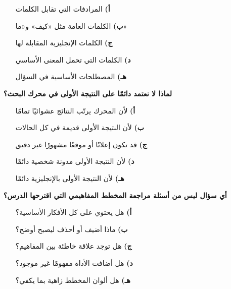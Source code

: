 \documentclass[11pt,a4paper]{article}
\begin{document}
\begin{multicols}{2}
\begin{minipage}{\linewidth}
\begin{itemize}[leftmargin=0.95cm, labelsep=4pt, itemsep=0pt, topsep=2pt, parsep=0pt]
  \item[\textbf{أ)}] المرادفات التي تقابل الكلمات
  \item[\textbf{ب)}] الكلمات العامة مثل «كيف» و«ما»
  \item[\textbf{ج)}] الكلمات الإنجليزية المقابلة لها
  \item[\textbf{د)}] الكلمات التي تحمل المعنى الأساسي
  \item[\textbf{هـ)}] المصطلحات الأساسية في السؤال
\end{itemize}
\end{minipage}\par\vspace{7pt plus 4pt}
\noindent\begin{minipage}{\linewidth}
\hangindent=0.7cm\textbf{لماذا لا نعتمد دائمًا على النتيجة الأولى في محرك البحث؟}
\begin{itemize}[leftmargin=0.95cm, labelsep=4pt, itemsep=0pt, topsep=2pt, parsep=0pt]
  \item[\textbf{أ)}] لأن المحرك يرتّب النتائج عشوائيًا تمامًا
  \item[\textbf{ب)}] لأن النتيجة الأولى قديمة في كل الحالات
  \item[\textbf{ج)}] قد تكون إعلانًا أو موقعًا مشهورًا غير دقيق
  \item[\textbf{د)}] لأن النتيجة الأولى مدونة شخصية دائمًا
  \item[\textbf{هـ)}] لأن النتيجة الأولى بالإنجليزية دائمًا
\end{itemize}
\end{minipage}\par\vspace{7pt plus 4pt}
\noindent\begin{minipage}{\linewidth}
\hangindent=0.7cm\textbf{أي سؤال ليس من أسئلة مراجعة المخطط المفاهيمي التي اقترحها الدرس؟}
\begin{itemize}[leftmargin=0.95cm, labelsep=4pt, itemsep=0pt, topsep=2pt, parsep=0pt]
  \item[\textbf{أ)}] هل يحتوي على كل الأفكار الأساسية؟
  \item[\textbf{ب)}] ماذا أضيف أو أحذف ليصبح أوضح؟
  \item[\textbf{ج)}] هل توجد علاقة خاطئة بين المفاهيم؟
  \item[\textbf{د)}] هل أضافت الأداة مفهومًا غير موجود؟
  \item[\textbf{هـ)}] هل ألوان المخطط زاهية بما يكفي؟
\end{itemize}
\end{minipage}\par\vspace{7pt plus 4pt}

\end{multicols}
\end{document}
